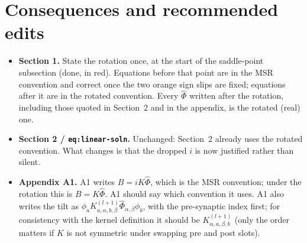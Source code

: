 \documentclass[11pt,a4paper]{article}
\begin{document}
\section{Consequences and recommended edits}

\begin{itemize}
  \item \textbf{Section 1.} State the rotation once, at the start of the
    saddle-point subsection (done, in red). Equations before that point are in
    the MSR convention and correct once the two orange sign slips are fixed;
    equations after it are in the rotated convention. Every $\hat\Phi$ written
    after the rotation, including those quoted in Section~2 and in the
    appendix, is the rotated (real) one.
  \item \textbf{Section 2 / \texttt{eq:linear-soln}.} Unchanged: Section~2
    already uses the rotated convention. What changes is that the dropped $i$
    is now justified rather than silent.
  \item \textbf{Appendix A1.} A1 writes $B = iK\hat\Phi$, which is the MSR
    convention; under the rotation this is $B = K\hat\Phi$. A1 should say which
    convention it uses. A1 also writes the tilt as
    $\phi_a K^{(l+1)}_{a,\alpha,b,\beta}\hat\Phi_{\alpha,\beta}\phi_b$, with the
    pre-synaptic index first; for consistency with the kernel definition it
    should be $K^{(l+1)}_{\alpha,a,\beta,b}$ (only the order matters if $K$ is
    not symmetric under swapping pre and post slots).
\end{itemize}
\end{document}
